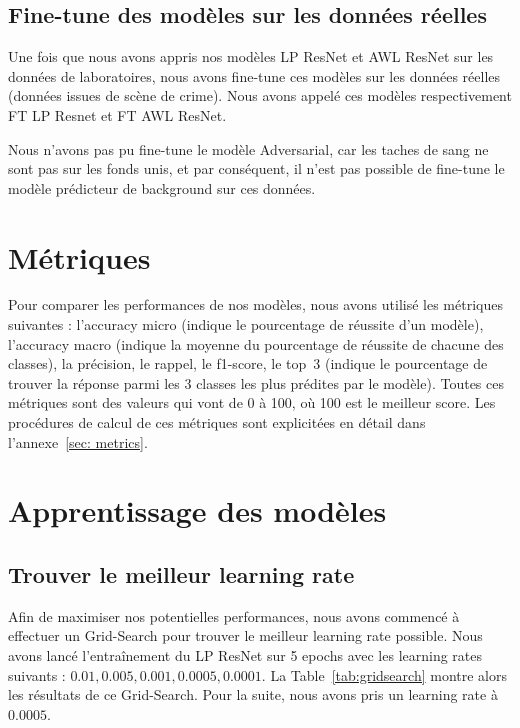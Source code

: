 \documentclass[a4paper]{article}
\begin{document}
\subsection{Fine-tune des modèles sur les données réelles}
Une fois que nous avons appris nos modèles LP ResNet et AWL ResNet sur les données de laboratoires, nous avons fine-tune ces modèles sur les données réelles (données issues de scène de crime). Nous avons appelé ces modèles respectivement FT LP Resnet et FT AWL ResNet.

Nous n'avons pas pu fine-tune le modèle Adversarial, car les taches de sang ne sont pas sur les fonds unis, et par conséquent, il n'est pas possible de fine-tune le modèle prédicteur de background sur ces données.

\section{Métriques}
Pour comparer les performances de nos modèles, nous avons utilisé les métriques suivantes : l'accuracy micro (indique le pourcentage de réussite d'un modèle), l'accuracy macro (indique la moyenne du pourcentage de réussite de chacune des classes), la précision, le rappel, le f1-score, le top~3 (indique le pourcentage de trouver la réponse parmi les 3 classes les plus prédites par le modèle). Toutes ces métriques sont des valeurs qui vont de 0 à 100, où 100 est le meilleur score. 
Les procédures de calcul de ces métriques sont explicitées en détail dans l'annexe~\ref{sec: metrics}.

\section{Apprentissage des modèles}

\subsection{Trouver le meilleur learning rate}
Afin de maximiser nos potentielles performances, nous avons commencé à effectuer un Grid-Search pour trouver le meilleur learning rate possible. Nous avons lancé l'entraînement du LP ResNet sur 5 epochs avec les learning rates suivants : $0.01, 0.005, 0.001, 0.0005, 0.0001$. La Table~\ref{tab:gridsearch} montre alors les résultats de ce Grid-Search. Pour la suite, nous avons pris un learning rate à $0.0005$.
\end{document}

